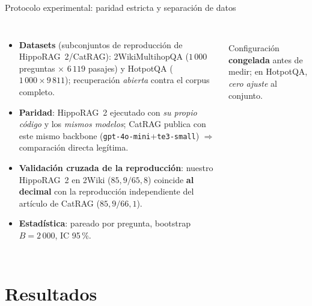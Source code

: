 \documentclass[aspectratio=169,10pt]{beamer}
\newcommand{\hippo}{HippoRAG~2}
\newcommand{\bien}[1]{\textcolor{verde}{\textbf{#1}}}
\begin{document}
\begin{frame}{Protocolo experimental: paridad estricta y separación de datos}
\begin{columns}[T]
\begin{itemize}\small
\item \textbf{Datasets} (subconjuntos de reproducción de \hippo{}/CatRAG):
  2WikiMultihopQA ($1\,000$ preguntas $\times$ $6\,119$ pasajes) y HotpotQA
  ($1\,000 \times 9\,811$); recuperación \emph{abierta} contra el corpus completo.
\item \textbf{Paridad}: \hippo{} ejecutado con \emph{su propio código} y los
  \emph{mismos modelos}; CatRAG publica con este mismo backbone
  (\texttt{gpt-4o-mini}+\texttt{te3-small}) $\Rightarrow$ comparación directa legítima.
\item \textbf{Validación cruzada de la reproducción}: nuestro \hippo{} en 2Wiki
  ($85{,}9/65{,}8$) coincide \bien{al decimal} con la reproducción independiente
  del artículo de CatRAG ($85{,}9/66{,}1$).
\item \textbf{Estadística}: pareado por pregunta, bootstrap $B{=}2\,000$, IC 95\,\%.
\end{itemize}
\centering
{}\\[1mm]
\footnotesize Configuración \textbf{congelada} antes de medir; en HotpotQA,
\emph{cero ajuste} al conjunto.
\end{columns}
\end{frame}

\section{Resultados}
\end{document}
